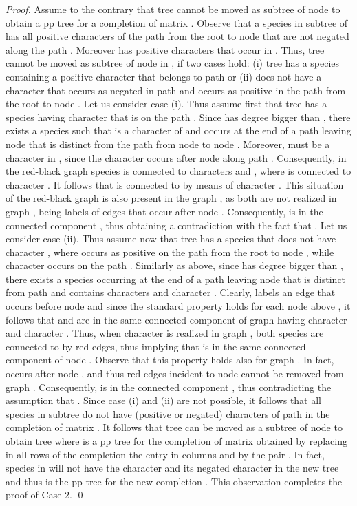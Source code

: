 \documentclass{llncs}
\begin{document}
\begin{proof}
Assume to the contrary that tree    cannot be moved as subtree of node  to obtain a pp tree for a completion of matrix . Observe that a species  in subtree   of  has all positive characters of the path  from the root  to node   that are not negated along the path .  Moreover  has positive characters that occur in . Thus, tree   cannot be moved as subtree of node  in ,  if   two cases hold: (i)  tree  has a species  containing a  positive character    that belongs to path  or (ii)   does not have a character  that occurs  as negated in path  and occurs as positive in the path from the root  to node .
Let us consider case (i). Thus assume first that tree  has a species  having character   that is on the path .  Since  has degree bigger than , there exists a species  such that  is a character of  and  occurs at the end of  a path leaving  node  that is distinct from the path  from node  to node .  Moreover,  must be a character in , since the character  occurs after node  along path .
Consequently, in the red-black graph  species  is connected to characters  and , where  is connected to character . It follows that  is connected to  by means of character .
This situation of the red-black graph  is also present in the graph 
, as both  are not   realized in graph , being  labels of edges that occur after node .  Consequently,   is in the   connected component , thus obtaining  a contradiction with the fact that .
Let us consider case (ii). 
Thus assume now that tree  has a species  that does not have character , where  occurs as positive on the path from the root  to node , while  character    occurs on the path . 
Similarly as above, since  has degree bigger than , there exists a species  occurring at the end of a path leaving node   that is distinct from path  and  contains characters  and character . Clearly,  labels an edge  that occurs  before node  and since the standard property holds for each node above ,  it follows that  and  are in the same connected component of graph     having character  and character . Thus, when character  is realized in graph , both species  are connected to  by  red-edges, thus implying that  is in the same connected component of  node .  Observe that  this property holds also for graph . In fact,  occurs after node , and thus red-edges incident to node   cannot be removed from   graph .  Consequently,  is in the connected component , thus    contradicting the assumption that . Since case (i) and (ii) are not possible, it follows that all species in subtree  do not have (positive or negated) characters of path   in the completion of matrix . It follows that tree  can be moved as a subtree of node  to obtain tree  where  is a pp tree for the completion   of matrix  obtained by replacing in all rows  of the completion  the   entry   in columns  and  by the pair .  In fact, species in  will not have  the character  and its negated character in the new tree  and thus  is the pp tree for the new completion . This observation completes the proof of Case 2.  \qed



\end{proof}
\end{document}
